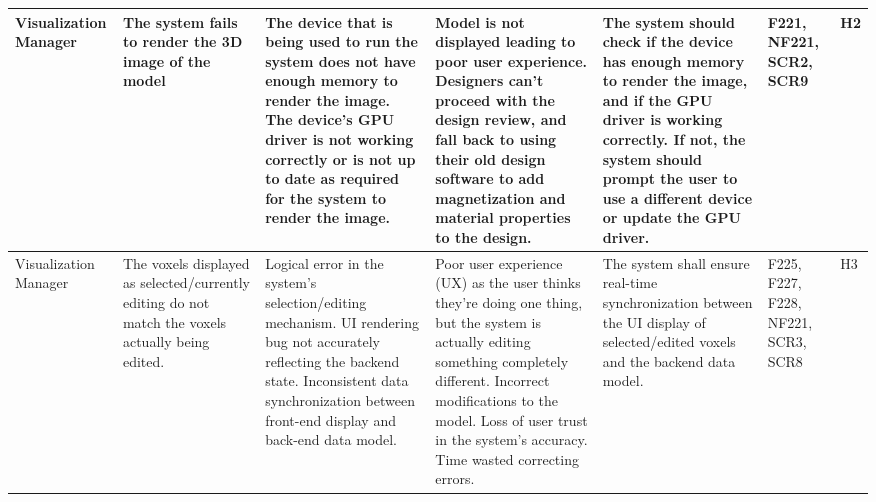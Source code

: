 \documentclass{article}
\begin{document}
\begin{landscape}
\begin{table}[H]
\begin{tabular}{|p{3cm}|p{3cm}|p{3.8cm}|p{3.8cm}|p{5.5cm}|p{2cm}|p{1cm}|}
\hline
Visualization Manager & The system fails to render the 3D image of the model & \textbullet{} The device that is being used to run the system does not have enough memory to render the image. \newline \textbullet{} The device's GPU driver is not working correctly or is not up to date as required for the system to render the image. & \textbullet{} Model is not displayed leading to poor user experience. \newline \textbullet{} Designers can't proceed with the design review, and fall back to using their old design software to add magnetization and material properties to the design. & The system should check if the device has enough memory to render the image, and if the GPU driver is working correctly. If not, the system should prompt the user to use a different device or update the GPU driver. & F221, NF221, SCR2, SCR9 & H2 \\
\hline
Visualization Manager & The voxels displayed as selected/currently editing do not match the voxels actually being edited. & \textbullet{} Logical error in the system's selection/editing mechanism. \newline \textbullet{} UI rendering bug not accurately reflecting the backend state. \newline \textbullet{} Inconsistent data synchronization between front-end display and back-end data model. & \textbullet{} Poor user experience (UX) as the user thinks they're doing one thing, but the system is actually editing something completely different. \newline \textbullet{} Incorrect modifications to the model. \newline \textbullet{} Loss of user trust in the system's accuracy. \newline \textbullet{} Time wasted correcting errors. & The system shall ensure real-time synchronization between the UI display of selected/edited voxels and the backend data model.  & F225, F227, F228, NF221, SCR3, SCR8 & H3 \\
\hline
\end{tabular}
\end{table}


\end{landscape}
\end{document}
